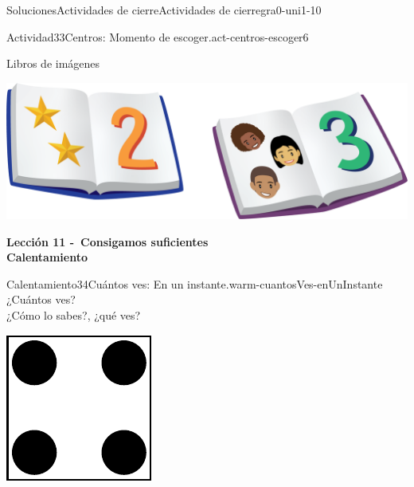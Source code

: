 \documentclass[twoside,10pt,]{article}
\begin{document}
\begin{solutions-section}{Soluciones}{Actividades de cierre}{}{Actividades de cierre}{}{}{gra0-uni1-10}
\begin{activitysolution}{Actividad}{33}{Centros: Momento de escoger.}{act-centros-escoger6}
\begin{sidebyside}{2}{0.025}{0.025}{0.05}
\begin{sbspanel}{0.45}
\end{sbspanel}%
\begin{sbspanel}{0.45}%
Libros de imágenes%
\par
\includegraphics[width=\linewidth]{external/png-source/K.1.D Beta Student Workbooks.Books.png}
\end{sbspanel}%
\end{sidebyside}%
\end{activitysolution}%
\par\medskip
\noindent\textbf{\large{}\space\textperiodcentered\space{}Lección 11 -~Consigamos suficientes\\
\space\textperiodcentered\space{}Calentamiento}
\begin{explorationsolution}{Calentamiento}{34}{Cuántos ves: En un instante.}{warm-cuantosVes-enUnInstante}%
¿Cuántos ves?\\
 ¿Cómo lo sabes?, ¿qué ves?%
\begin{sidebyside}{2}{0}{0}{0}%
\begin{sbspanel}{0.5}%
\includegraphics[width=\linewidth]{external/svg-source/tikz-file-148153.pdf}

\end{sbspanel}
\end{sidebyside}
\end{explorationsolution}
\end{solutions-section}
\end{document}
